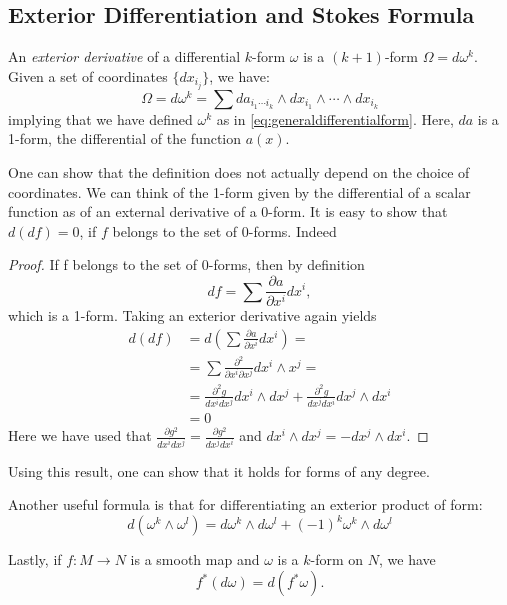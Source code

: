 \subsection{Exterior Differentiation and Stokes Formula}
\begin{definition}
  An \textit{exterior derivative} of a differential $k$-form $\omega$ is
  a $(k+1)$-form $\Omega=d\omega^k$. Given a set of coordinates $\{dx_{i_j}\}$,
  we have:
  \begin{equation}
    \Omega = d\omega^k = \sum{da_{i_1\cdots i_k}\wedge
      dx_{i_1}\wedge\cdots\wedge dx_{i_k}}
    \end{equation}
    implying that we have defined $\omega^k$ as in
    \eqref{eq:generaldifferentialform}. Here, $da$ is a 1-form, the
    differential of the function $a(x)$.
\end{definition}
One can show that the definition does not actually depend on the choice of
coordinates. We can think of the 1-form given by the differential of a scalar
function as of an external derivative of a 0-form.
It is easy to show that $d(df)=0$, if $f$ belongs to the set of 0-forms. Indeed
\begin{proof}
  If f belongs to the set of 0-forms, then by definition
  \begin{equation}
   df = \sum{\frac{\partial a}{\partial x^i}dx^i},
  \end{equation}
  which is a 1-form. Taking an exterior derivative again yields
  \begin{align}
     d(df) &= d\left(\sum{\frac{\partial a}{\partial x^i}dx^i}\right)=\nonumber\\
    &= \sum{\frac{\partial^2}{\partial x^i\partial x^j}dx^i\wedge x^j}
     =\nonumber\\
    &= \frac{\partial^2 g}{dx^i dx^j}dx^i\wedge dx^j + \frac{\partial^2 g}{dx^j
    dx^i}dx^j\wedge dx^i\nonumber\\
    &= 0
  \end{align}
  Here we have used that $\frac{\partial g^2}{dx^i dx^j} = \frac{\partial
  g^2}{dx^j dx^i}$ and $dx^i\wedge dx^j = -dx^j\wedge dx^i$.
\end{proof}
Using this result, one can show that it holds for forms of any degree.
\par Another useful formula is that for differentiating an exterior product of
form:
\begin{equation}
  d(\omega^k\wedge\omega^l) = d\omega^k\wedge d\omega^l + (-1)^k\omega^k\wedge
  d\omega^l
\end{equation}
\par Lastly, if $f:M\rightarrow N$ is a smooth map and $\omega$ is a $k$-form
on $N$, we have
\begin{equation}
  f^*(d\omega) = d(f^*\omega).
\end{equation}
